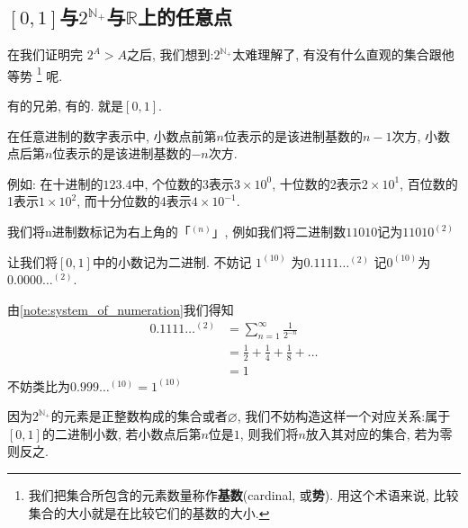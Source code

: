 \documentclass[UTF8]{mathrep}
\begin{document}
\subsection{
  \texorpdfstring{$\left[ 0, 1 \right]$与$2^{\mathbb{N}_+}
  $与$\mathbb{R}$上的任意点}{[0, 1]与2\^N+与R上的任意点}
}
在我们证明完 $2^{A}>A$之后, 我们想到:$2^{\mathbb{N}_+} $太难理解了,
有没有什么直观的集合跟他等势
\footnote{我们把集合所包含的元素数量称作\textbf{基数}(cardinal, 或\textbf{势}).
用这个术语来说, 比较集合的大小就是在比较它们的基数的大小. }
呢.

有的兄弟, 有的. 就是$\left[0, 1\right]$.

\begin{note}[任意进制的数字表述] \label{note:system_of_numeration}
  在任意进制的数字表示中,
  小数点前第$n$位表示的是该进制基数的$n-1$次方,
  小数点后第$n$位表示的是该进制基数的$-n$次方.

  例如: 在十进制的$123. 4$中, 个位数的3表示$3 \times 10^{0} $,
  十位数的2表示$2 \times 10^{1} $,
  百位数的1表示$1 \times 10^{2} $,
  而十分位数的4表示$4 \times 10^{-1} $.

  我们将n进制数标记为右上角的「$^{(n)}$」, 例如我们将二进制数$11010$记为$11010^{(2)}$
\end{note}

让我们将$\left[ 0, 1 \right]$中的小数记为二进制.
不妨记 $1^{(10)} $ 为$0. 1111\ldots ^{(2)} $
记$0^{(10)} $为 $0. 0000\ldots ^{(2)} $.

\begin{note}[$0. 1111\ldots ^{(2)}  $等于$1^{(10)}$]
  由\cref{note:system_of_numeration}我们得知
  \begin{align*}
    0. 1111\ldots ^{(2)} & = \sum_{n=1}^{\infty} \frac{1}{2^{-n}}          \\
    & = \frac{1}{2}+\frac{1}{4} +\frac{1}{8} + \ldots \\
    & = 1
  \end{align*}
  不妨类比为$0. 999\ldots ^{(10)} = 1 ^{(10)} $
\end{note}

因为$2^{\mathbb{N}_+} $的元素是正整数构成的集合或者$\varnothing$,
我们不妨构造这样一个对应关系:属于$\left[0, 1\right]$的二进制小数, 若小数点后第$n$位是$1$,
则我们将$n$放入其对应的集合, 若为零则反之.
\end{document}
